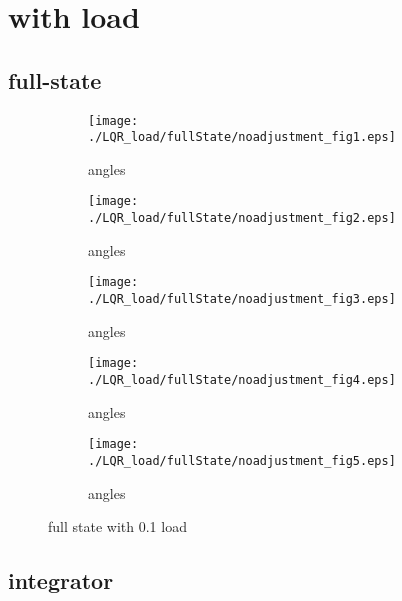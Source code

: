 \section{with load}
\subsection{full-state}

\begin{figure}[H]
	\centering
	\begin{subfigure}[b]{0.3\textwidth}
		\texttt{[image: ./LQR\_load/fullState/noadjustment\_fig1.eps]}
		\caption{angles}
	\end{subfigure}
	\begin{subfigure}[b]{0.3\textwidth}
		\texttt{[image: ./LQR\_load/fullState/noadjustment\_fig2.eps]}
		\caption{angles}
	\end{subfigure}
	\begin{subfigure}[b]{0.3\textwidth}
		\texttt{[image: ./LQR\_load/fullState/noadjustment\_fig3.eps]}
		\caption{angles}
	\end{subfigure}
	\begin{subfigure}[b]{0.3\textwidth}
		\texttt{[image: ./LQR\_load/fullState/noadjustment\_fig4.eps]}
		\caption{angles}
	\end{subfigure}
	\begin{subfigure}[b]{0.3\textwidth}
		\texttt{[image: ./LQR\_load/fullState/noadjustment\_fig5.eps]}
		\caption{angles}
	\end{subfigure}

	\caption{full state with 0.1 load}\label{fig:full state with load unadjusted}
\end{figure}

\subsection{integrator}

